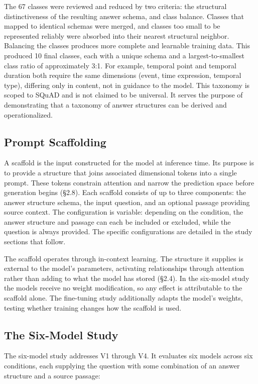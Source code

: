 \documentclass{article}
\begin{document}
The 67 classes were reviewed and reduced by two criteria: the structural distinctiveness of the resulting answer schema, and class balance. Classes that mapped to identical schemas were merged, and classes too small to be represented reliably were absorbed into their nearest structural neighbor. Balancing the classes produces more complete and learnable training data. This produced 10 final classes, each with a unique schema and a largest-to-smallest class ratio of approximately 3:1. For example, temporal point and temporal duration both require the same dimensions (event, time expression, temporal type), differing only in content, not in guidance to the model. This taxonomy is scoped to SQuAD and is not claimed to be universal. It serves the purpose of demonstrating that a taxonomy of answer structures can be derived and operationalized.

\subsection{Prompt Scaffolding}

A scaffold is the input constructed for the model at inference time. Its purpose is to provide a structure that joins associated dimensional tokens into a single prompt. These tokens constrain attention and narrow the prediction space before generation begins (\S2.8). Each scaffold consists of up to three components: the answer structure schema, the input question, and an optional passage providing source context. The configuration is variable: depending on the condition, the answer structure and passage can each be included or excluded, while the question is always provided. The specific configurations are detailed in the study sections that follow.

The scaffold operates through in-context learning. The structure it supplies is external to the model's parameters, activating relationships through attention rather than adding to what the model has stored (\S2.4). In the six-model study the models receive no weight modification, so any effect is attributable to the scaffold alone. The fine-tuning study additionally adapts the model's weights, testing whether training changes how the scaffold is used.

\subsection{The Six-Model Study}

The six-model study addresses V1 through V4. It evaluates six models across six conditions, each supplying the question with some combination of an answer structure and a source passage:
\end{document}
